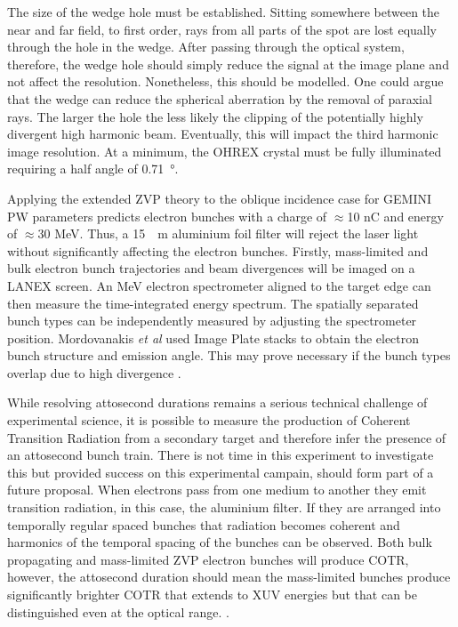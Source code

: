 The size of the wedge hole must be established. Sitting somewhere between the near and far field, to first order, rays from all parts of the spot are lost equally through the hole in the wedge. After passing through the optical system, therefore, the wedge hole should simply reduce the signal at the image plane and not affect the resolution. Nonetheless, this should be modelled. One could argue that the wedge can reduce the spherical aberration by the removal of paraxial rays. The larger the hole the less likely the clipping of the potentially highly divergent high harmonic beam. Eventually, this will impact the third harmonic image resolution. At a minimum, the OHREX crystal must be fully illuminated requiring a half angle of \qty{0.71}{\degree}.

Applying the extended ZVP theory to the oblique incidence case for GEMINI PW parameters predicts electron bunches with a charge of $\approx$10 nC and energy of $\approx$30 MeV. Thus, a \qty{15}{\mu m} aluminium foil filter will reject the laser light without significantly affecting the electron bunches.
Firstly, mass-limited and bulk electron bunch trajectories and beam divergences will be imaged on a LANEX screen. An MeV electron spectrometer aligned to the target edge can then measure the time-integrated energy spectrum. The spatially separated bunch types can be independently measured by adjusting the spectrometer position. Mordovanakis \textit{et al} used Image Plate stacks to obtain the electron bunch structure and emission angle. This may prove necessary if the bunch types overlap due to high divergence \cite{mordovanakisQuasimonoenergeticElectronBeams2009}. 

While resolving attosecond durations remains a serious technical challenge of experimental science, it is possible to measure the production of Coherent Transition Radiation from a secondary target and therefore infer the presence of an attosecond bunch train. There is not time in this experiment to investigate this but provided success on this experimental campain, should form part of a future proposal. When electrons pass from one medium to another they emit transition radiation, in this case, the aluminium filter. If they are arranged into temporally regular spaced bunches that radiation becomes coherent and harmonics of the temporal spacing of the bunches can be observed. Both bulk propagating and mass-limited ZVP electron bunches will produce COTR, however, the attosecond duration should mean the mass-limited bunches produce significantly brighter COTR that extends to XUV energies but that can be distinguished even at the optical range.
\cite{linIsolatedAttosecondElectron2020}.


